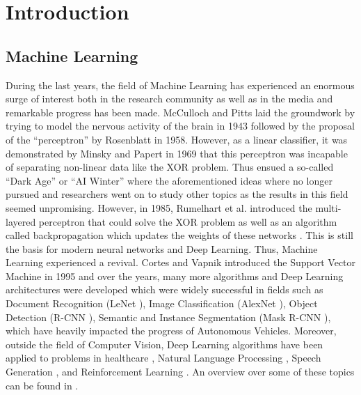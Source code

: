 \documentclass[a4paper, 11pt, oneside]{scrartcl}
\theoremstyle{break}
\numberwithin{equation}{section}
\begin{document}
	\section{Introduction}
	\setcounter{page}{1}

		\subsection{Machine Learning}
			During the last years, the field of Machine Learning has experienced an enormous surge of interest both in the research community as well as in the media and remarkable progress has been made. 
			McCulloch and Pitts laid the groundwork by trying to model the nervous activity of the brain in 1943 \cite{MP43} followed by the proposal of the ``perceptron'' by Rosenblatt \cite{R58} in 1958. 
			However, as a linear classifier, it was demonstrated by Minsky and Papert in 1969 \cite{M17} that this perceptron was incapable of separating non-linear data like the XOR problem. Thus ensued a so-called ``Dark Age'' or ``AI Winter'' where the aforementioned ideas where no longer pursued and researchers went on to study other topics as the results in this field seemed unpromising. 
			However, in 1985, Rumelhart et al. introduced the multi-layered perceptron that could solve the XOR problem as well as an algorithm called backpropagation which updates the weights of these networks \cite{RHW85}.
			This is still the basis for modern neural networks and Deep Learning.
			Thus, Machine Learning experienced a revival. 
			Cortes and Vapnik introduced the Support Vector Machine in 1995 \cite{CV95} and over the years, many more algorithms and Deep Learning architectures were developed which were widely successful in fields such as Document Recognition (LeNet \cite{LBB+98}), Image Classification (AlexNet \cite{KSH12}), Object Detection (R-CNN \cite{GDD+14, RHG+15}), Semantic and Instance Segmentation (Mask R-CNN \cite{HGD+17, LDY19}), which have heavily impacted the progress of Autonomous Vehicles. 
			Moreover, outside the field of Computer Vision, Deep Learning algorithms have been applied to problems in healthcare \cite{ERR+19}, Natural Language Processing \cite{VSP+17}, Speech Generation \cite{ODZ+16}, and Reinforcement Learning \cite{alphastarblog}.
			An overview over some of these topics can be found in \cite{S15, SM19, VDD+18}.
\end{document}
